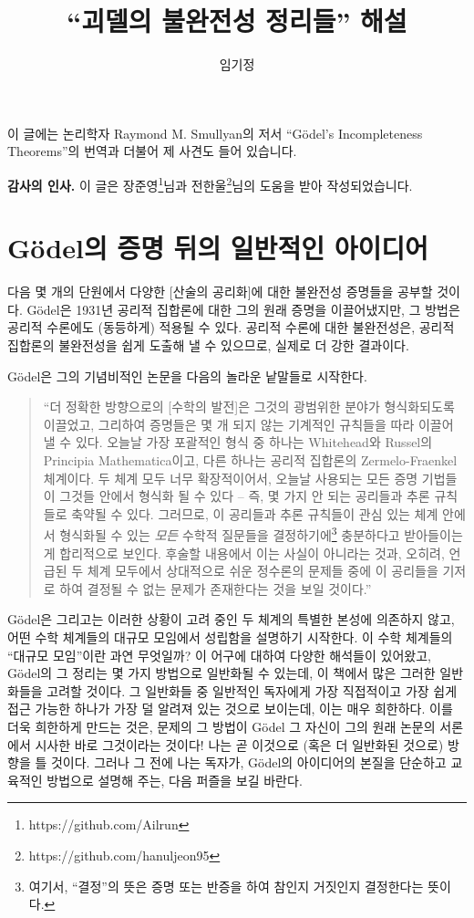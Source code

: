\documentclass[12pt]{paper}
\title{``괴델의 불완전성 정리들'' 해설}
\author{임기정}
\begin{document}
\maketitle

이 글에는 논리학자 Raymond M. Smullyan의 저서 ``G\"odel's Incompleteness Theorems''의 번역과 더불어 제 사견도 들어 있습니다.

\textbf{감사의 인사.} 이 글은 장준영\footnote{https://github.com/Ailrun}님과 전한울\footnote{https://github.com/hanuljeon95}님의 도움을 받아 작성되었습니다.

\newpage

\section{G\"odel의 증명 뒤의 일반적인 아이디어}
\hspace{12pt}

다음 몇 개의 단원에서 다양한 [산술의 공리화]에 대한 불완전성 증명들을 공부할 것이다.
G\"odel은 1931년 공리적 집합론에 대한 그의 원래 증명을 이끌어냈지만,
그 방법은 공리적 수론에도 (동등하게) 적용될 수 있다.
공리적 수론에 대한 불완전성은,
공리적 집합론의 불완전성을 쉽게 도출해 낼 수 있으므로,
실제로 더 강한 결과이다.

G\"odel은 그의 기념비적인 논문을 다음의 놀라운 낱말들로 시작한다.

\begin{quotation}
``더 정확한 방향으로의 [수학의 발전]은 그것의 광범위한 분야가 형식화되도록 이끌었고,
그리하여 증명들은 몇 개 되지 않는 기계적인 규칙들을 따라 이끌어 낼 수 있다.
오늘날 가장 포괄적인 형식 중 하나는 Whitehead와 Russel의 Principia Mathematica이고,
다른 하나는 공리적 집합론의 Zermelo-Fraenkel 체계이다.
두 체계 모두 너무 확장적이어서,
오늘날 사용되는 모든 증명 기법들이 그것들 안에서 형식화 될 수 있다 --
즉, 몇 가지 안 되는 공리들과 추론 규칙들로 축약될 수 있다.
그러므로, 이 공리들과 추론 규칙들이 관심 있는 체계 안에서 형식화될 수 있는 \textit{모든} 수학적 질문들을 결정하기에\footnote
{
여기서, ``결정''의 뜻은 증명 또는 반증을 하여 참인지 거짓인지 결정한다는 뜻이다.
}
충분하다고 받아들이는 게 합리적으로 보인다.
후술할 내용에서 이는 사실이 아니라는 것과,
오히려, 언급된 두 체계 모두에서 상대적으로 쉬운 정수론의 문제들 중에 이 공리들을 기저로 하여 결정될 수 없는 문제가 존재한다는 것을 보일 것이다.''
\end{quotation}

G\"odel은 그리고는 이러한 상황이 고려 중인 두 체계의 특별한 본성에 의존하지 않고,
어떤 수학 체계들의 대규모 모임에서 성립함을 설명하기 시작한다.
이 수학 체계들의 ``대규모 모임''이란 과연 무엇일까?
이 어구에 대하여 다양한 해석들이 있어왔고,
G\"odel의 그 정리는 몇 가지 방법으로 일반화될 수 있는데,
이 책에서 많은 그러한 일반화들을 고려할 것이다.
그 일반화들 중 일반적인 독자에게 가장 직접적이고 가장 쉽게 접근 가능한 하나가 가장 덜 알려져 있는 것으로 보이는데,
이는 매우 희한하다.
이를 더욱 희한하게 만드는 것은,
문제의 그 방법이 G\"odel 그 자신이 그의 원래 논문의 서론에서 시사한 바로 그것이라는 것이다!
나는 곧 이것으로 (혹은 더 일반화된 것으로) 방향을 틀 것이다.
그러나 그 전에 나는 독자가,
G\"odel의 아이디어의 본질을 단순하고 교육적인 방법으로 설명해 주는,
다음 퍼즐을 보길 바란다.
\end{document}

